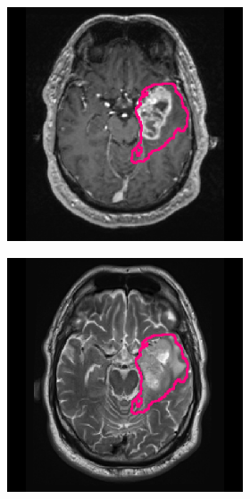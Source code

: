 \begin{subappendices}
\begin{figure}[htbp]
\begin{subfigure}[b]{0.95\textwidth}
\begin{subfigure}[b]{0.215\textwidth}
        \includegraphics[width=\textwidth, clip, trim=2.5cm 0.5cm 2.5cm 0.5cm]{Figures/Random_segs/T1GD_TCGA-19-5951.png}
        \end{subfigure}
        \hfill
        \begin{subfigure}[b]{0.215\textwidth}
        \includegraphics[width=\textwidth, clip, trim=2.5cm 0.5cm 2.5cm 0.5cm]{Figures/Random_segs/T2_TCGA-19-5951.png}

\end{subfigure}
\end{subfigure}
\end{figure}
\end{subappendices}
